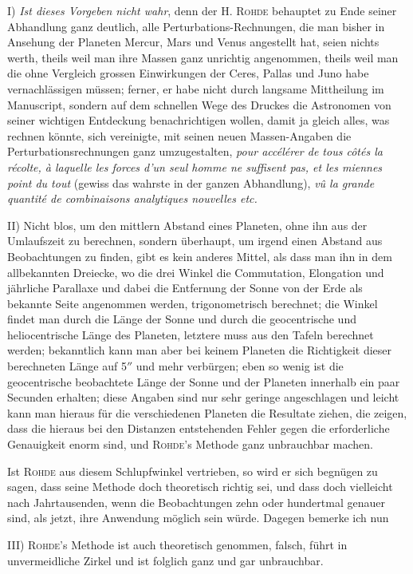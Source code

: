 \noindent I) \emph{Ist dieses Vorgeben nicht wahr}, denn der H. \textsc{Rohde} behauptet zu Ende seiner Abhandlung ganz deutlich, alle Perturbations-Rechnungen, die man bisher in Ansehung der Planeten Mercur, Mars und Venus angestellt hat, seien nichts werth, theils weil man ihre Massen ganz unrichtig angenommen, theils weil man die ohne Vergleich grossen Einwirkungen der Ceres, Pallas und Juno habe vernachlässigen müssen; ferner, er habe nicht durch langsame Mittheilung im Manuscript, sondern auf dem schnellen Wege des Druckes die Astronomen von seiner wichtigen Entdeckung benachrichtigen wollen, damit ja gleich alles, was rechnen könnte, sich vereinigte, mit seinen neuen Massen-Angaben die Perturbationsrechnungen ganz umzugestalten, \emph{pour accélérer de tous côtés la récolte, à laquelle les forces d'un seul homme ne suffisent pas, et les miennes point du tout} (gewiss das wahrste in der ganzen Abhandlung), \emph{vû la grande quantité de combinaisons analytiques nouvelles etc.}

\noindent II) Nicht blos, um den mittlern Abstand eines Planeten, ohne ihn aus der Umlaufszeit zu berechnen, sondern überhaupt, um irgend einen Abstand aus Beobachtungen zu finden, gibt es kein anderes Mittel, als dass man ihn in dem allbekannten Dreiecke, wo die drei Winkel die Commutation, Elongation und jährliche Parallaxe und dabei die Entfernung der Sonne von der Erde als bekannte Seite angenommen werden, trigonometrisch berechnet; die Winkel findet man durch die Länge der Sonne und durch die geocentrische und heliocentrische Länge des Planeten, letztere muss aus den Tafeln berechnet werden; bekanntlich kann man aber bei keinem Planeten die Richtigkeit dieser berechneten Länge auf 5$''$ und mehr verbürgen; eben so wenig ist die geocentrische beobachtete Länge der Sonne und der Planeten innerhalb ein paar Secunden erhalten; diese Angaben sind nur sehr geringe angeschlagen und leicht kann man hieraus für die verschiedenen Planeten die Resultate ziehen, die zeigen, dass die hieraus bei den Distanzen entstehenden Fehler gegen die erforderliche Genauigkeit enorm sind, und \textsc{Rohde}'s Methode ganz unbrauchbar machen.

Ist \textsc{Rohde} aus diesem Schlupfwinkel vertrieben, so wird er sich begnügen zu sagen, dass seine Methode doch theoretisch richtig sei, und dass doch vielleicht nach Jahrtausenden, wenn die Beobachtungen zehn oder hundertmal genauer sind, als jetzt, ihre Anwendung möglich sein würde. Dagegen bemerke ich nun

III) \textsc{Rohde}'s Methode ist auch theoretisch genommen, falsch, führt in unvermeidliche Zirkel und ist folglich ganz und gar unbrauchbar.

